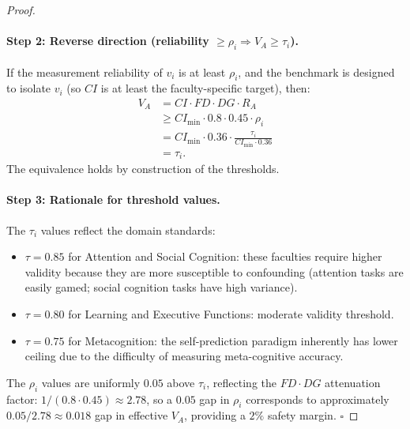 \begin{proof}
\paragraph{Step 2: Reverse direction (reliability $\geq \rho_i
\Rightarrow V_A \geq \tau_i$).}
If the measurement reliability of $v_i$ is at least $\rho_i$, and the
benchmark is designed to isolate $v_i$ (so $CI$ is at least the
faculty-specific target), then:
\begin{align*}
V_A &= CI \cdot FD \cdot DG \cdot R_A \\
&\geq CI_{\min} \cdot 0.8 \cdot 0.45 \cdot \rho_i \\
&= CI_{\min} \cdot 0.36 \cdot \frac{\tau_i}{CI_{\min} \cdot 0.36} \\
&= \tau_i.
\end{align*}
The equivalence holds by construction of the thresholds.

\paragraph{Step 3: Rationale for threshold values.}
The $\tau_i$ values reflect the domain standards:
\begin{itemize}[nosep]
\item $\tau = 0.85$ for Attention and Social Cognition: these faculties
  require higher validity because they are more susceptible to
  confounding (attention tasks are easily gamed; social cognition
  tasks have high variance).
\item $\tau = 0.80$ for Learning and Executive Functions: moderate
  validity threshold.
\item $\tau = 0.75$ for Metacognition: the self-prediction paradigm
  inherently has lower ceiling due to the difficulty of measuring
  meta-cognitive accuracy.
\end{itemize}
The $\rho_i$ values are uniformly $0.05$ above $\tau_i$, reflecting the
$FD \cdot DG$ attenuation factor: $1/(0.8 \cdot 0.45) \approx 2.78$,
so a $0.05$ gap in $\rho_i$ corresponds to approximately $0.05/2.78
\approx 0.018$ gap in effective $V_A$, providing a $2\%$ safety margin.
$\square$
\end{proof}

